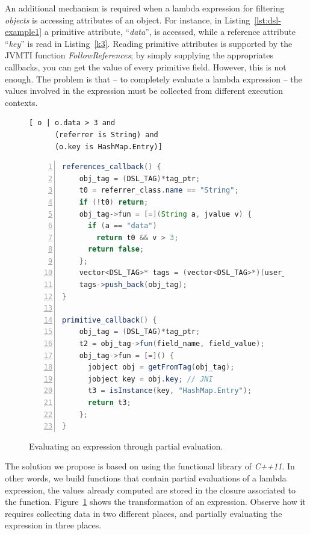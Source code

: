 An additional mechanism is required when a lambda expression for filtering \textit{objects} is accessing attributes of an object.
For instance, in Listing~\ref{lst:dsl-example1} a primitive attribute, ``\textit{data}'', is accessed, while a reference attribute ``\textit{key}'' is read in Listing~\ref{k3}.
Reading primitive attributes is supported by the JVMTI function \textit{FollowReferences}; by simply supplying the appropriates callbacks,  you can get the value of every primitive field.
However, this is not enough.
The problem is that -- to completely evaluate a lambda expression -- the values involved in the expression must be collected from different execution contexts.

\begin{figure}[!b]
\centering
\begin{minipage}[t]{0.35\linewidth}
\begin{lstlisting}[language=DSL2]
[ o | o.data > 3 and 
	  (referrer is String) and 
	  (o.key is HashMap.Entry)] 
\end{lstlisting}
\end{minipage}
\hspace{0.07\linewidth}
\begin{minipage}[t]{0.55\linewidth}
\begin{lstlisting}[language=java, frame=L, numbers=left,numberstyle=\color{black}\scriptsize]
references_callback() {
	obj_tag = (DSL_TAG)*tag_ptr;
	t0 = referrer_class.name == "String";
	if (!t0) return;
	obj_tag->fun = [=](String a, jvalue v) { 
	  if (a == "data")
	    return t0 && v > 3;
	  return false;
	};
	vector<DSL_TAG>* tags = (vector<DSL_TAG>*)(user_data);
	tags->push_back(obj_tag);
}

primitive_callback() {
	obj_tag = (DSL_TAG)*tag_ptr;
	t2 = obj_tag->fun(field_name, field_value);
	obj_tag->fun = [=]() { 
	  jobject obj = getFromTag(obj_tag); 
	  jobject key = obj.key; // JNI
	  t3 = isInstance(key, "HashMap.Entry");
	  return t3; 
	};
}
\end{lstlisting}
\end{minipage}
\caption{Evaluating an expression through partial evaluation.} \label{fig:dsl-closures}
\end{figure}

The solution we propose is based on using the functional library of \textit{C++11}.
In other words, we build functions that contain partial evaluations of a lambda expression, the values already computed are stored in the closure associated to the function.
Figure~\ref{fig:dsl-closures} shows the transformation of an expression.
Observe how it requires collecting data in two different places, and partially evaluating the expression in three places.

